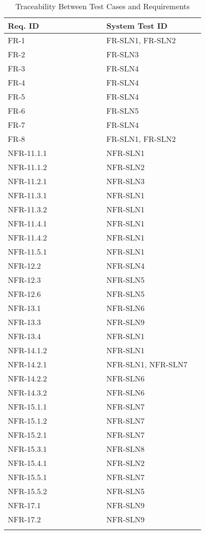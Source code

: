 \documentclass[12pt, titlepage]{article}
\begin{document}
\begin{longtable}{|p{0.45\linewidth}|p{0.45\linewidth}|}
  \hline
  \textbf{Req. ID} & \textbf{System Test ID} \\
  \hline
  FR-1 & FR-SLN1, FR-SLN2 \\
  \hline
  FR-2 & FR-SLN3 \\
  \hline
  FR-3 & FR-SLN4 \\
  \hline
  FR-4 & FR-SLN4 \\
  \hline
  FR-5 & FR-SLN4 \\
  \hline
  FR-6 & FR-SLN5 \\
  \hline
  FR-7 & FR-SLN4 \\
  \hline
  FR-8 & FR-SLN1, FR-SLN2 \\
  \hline
  NFR-11.1.1 & NFR-SLN1 \\
  \hline
  NFR-11.1.2 & NFR-SLN2 \\
  \hline
  NFR-11.2.1 & NFR-SLN3 \\
  \hline
  NFR-11.3.1 & NFR-SLN1 \\
  \hline
  NFR-11.3.2 & NFR-SLN1 \\
  \hline
  NFR-11.4.1 & NFR-SLN1 \\
  \hline
  NFR-11.4.2 & NFR-SLN1 \\
  \hline
  NFR-11.5.1 & NFR-SLN1 \\
  \hline
  NFR-12.2 & NFR-SLN4 \\
  \hline
  NFR-12.3 & NFR-SLN5 \\
  \hline
  NFR-12.6 & NFR-SLN5 \\
  \hline
  NFR-13.1 & NFR-SLN6 \\
  \hline
  NFR-13.3 & NFR-SLN9 \\
  \hline
  NFR-13.4 & NFR-SLN1 \\
  \hline
  NFR-14.1.2 & NFR-SLN1 \\
  \hline
  NFR-14.2.1 & NFR-SLN1, NFR-SLN7 \\
  \hline
  NFR-14.2.2 & NFR-SLN6 \\
  \hline
  NFR-14.3.2 & NFR-SLN6 \\
  \hline
  NFR-15.1.1 & NFR-SLN7 \\
  \hline
  NFR-15.1.2 & NFR-SLN7 \\
  \hline
  NFR-15.2.1 & NFR-SLN7 \\
  \hline
  NFR-15.3.1 & NFR-SLN8 \\
  \hline
  NFR-15.4.1 & NFR-SLN2 \\
  \hline
  NFR-15.5.1 & NFR-SLN7 \\
  \hline
  NFR-15.5.2 & NFR-SLN5 \\
  \hline
  NFR-17.1 & NFR-SLN9 \\
  \hline
  NFR-17.2 & NFR-SLN9 \\
  \hline
  \caption{Traceability Between Test Cases and Requirements}
  \label{traceability}
\end{longtable}
\end{document}
